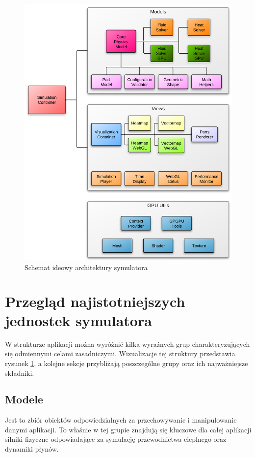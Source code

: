 \begin{figure}[!h]
\centering
\includegraphics[width=\textwidth]{img/architektura}
\caption{Schemat ideowy architektury symulatora \en}
\label{fig:architektura}
\end{figure}

\section{Przegląd najistotniejszych jednostek symulatora}

W strukturze aplikacji można wyróżnić kilka wyraźnych grup charakteryzujących
się odmiennymi celami zasadniczymi. Wizualizacje tej struktury przedstawia
rysunek \ref{fig:architektura}, a kolejne sekcje przybliżają poszczególne grupy
oraz ich najważniejsze składniki.

\subsection{Modele}
\label{sec:modele}

Jest to zbiór obiektów odpowiedzialnych za przechowywanie i manipulowanie danymi
aplikacji. To właśnie w tej grupie znajdują się kluczowe dla całej aplikacji
silniki fizyczne odpowiadające za symulację przewodnictwa cieplnego oraz
dynamiki płynów.

